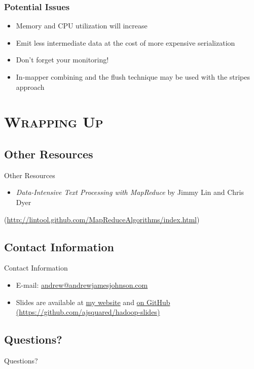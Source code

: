 \documentclass[xcolor=x11names,compress]{beamer}
\renewcommand{\(}{\begin{columns}}
\renewcommand{\)}{\end{columns}}
\newcommand{\<}[1]{\begin{column}{#1}}
\renewcommand{\>}{\end{column}}
\begin{document}
\begin{frame}
  \frametitle{Potential Issues}
  \begin{itemize}
  \item<1,2> Memory and CPU utilization will increase
  \item<2> Emit less intermediate data at the cost of more expensive serialization
  \item<3> Don't forget your monitoring!
  \item<4> In-mapper combining and the flush technique may be used
    with the stripes approach
  \end{itemize}
\end{frame}

\section{\scshape Wrapping Up}

\subsection{Other Resources}
\begin{frame}{Other Resources}
  \begin{itemize}
  \item \emph{Data-Intensive Text Processing with MapReduce} by Jimmy
    Lin and Chris Dyer
  \end{itemize}
  (\url{http://lintool.github.com/MapReduceAlgorithms/index.html})
\end{frame}

\subsection{Contact Information}
\begin{frame}{Contact Information}
  \begin{itemize}
  \item E-mail: \href{mailto:andrew@andrewjamesjohnson.com}{andrew@andrewjamesjohnson.com}
  \item Slides are available at \href{}{my website} and
    \href{https://github.com/ajsquared/hadoop-slides}{on GitHub (\url{https://github.com/ajsquared/hadoop-slides})}
  \end{itemize}
\end{frame}

\subsection{Questions?}
\begin{frame}
  \Huge
  Questions?
\end{frame}
\end{document}
